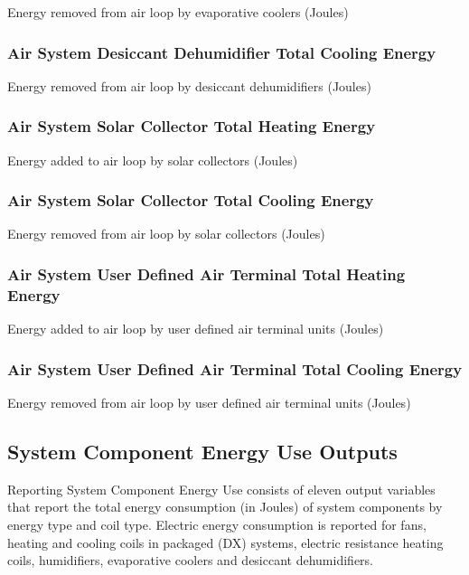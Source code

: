 Energy removed from air loop by evaporative coolers (Joules)

\subsubsection{Air System Desiccant Dehumidifier Total Cooling Energy}\label{air-system-desiccant-dehumidifier-total-cooling-energy}

Energy removed from air loop by desiccant dehumidifiers (Joules)

\subsubsection{Air System Solar Collector Total Heating Energy}\label{air-system-solar-collector-total-heating-energy}

Energy added to air loop by solar collectors (Joules)

\subsubsection{Air System Solar Collector Total Cooling Energy}\label{air-system-solar-collector-total-cooling-energy}

Energy removed from air loop by solar collectors (Joules)

\subsubsection{Air System User Defined Air Terminal Total Heating Energy}\label{air-system-user-defined-air-terminal-total-heating-energy}

Energy added to air loop by user defined air terminal units (Joules)

\subsubsection{Air System User Defined Air Terminal Total Cooling Energy}\label{air-system-user-defined-air-terminal-total-cooling-energy}

Energy removed from air loop by user defined air terminal units (Joules)

\subsection{System Component Energy Use Outputs}\label{system-component-energy-use-outputs}

Reporting System Component Energy Use consists of eleven output variables that report the total energy consumption (in Joules) of system components by energy type and coil type. Electric energy consumption is reported for fans, heating and cooling coils in packaged (DX) systems, electric resistance heating coils, humidifiers, evaporative coolers and desiccant dehumidifiers.

